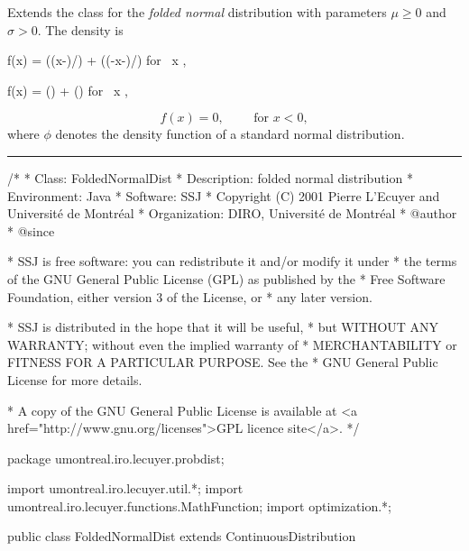 
Extends the class  for
the {\em folded normal\/} distribution with
parameters $\mu \ge 0$  and $\sigma > 0$.
The density is
\begin{htmlonly}
\eq
 f(x) =   \phi \left((x-\mu)/\sigma\right) + \phi \left((-x-\mu)/\sigma\right) 
   \qquad \mbox {for  } x ,
\endeq
\end{htmlonly}
\begin{latexonly} 
\eq
 f(x) = \phi \left(\right) +
        \phi \left(\right) 
   \qquad \mbox {for  } x ,   
\endeq
\end{latexonly}
$$
f(x) = 0, \qquad \mbox{ for } x < 0,
$$ 
where $ \phi $ denotes the density function 
of a standard normal distribution.

\bigskip\hrule

\begin{code}
\begin{hide}
/*
 * Class:        FoldedNormalDist
 * Description:  folded normal distribution
 * Environment:  Java
 * Software:     SSJ 
 * Copyright (C) 2001  Pierre L'Ecuyer and Université de Montréal
 * Organization: DIRO, Université de Montréal
 * @author       
 * @since

 * SSJ is free software: you can redistribute it and/or modify it under
 * the terms of the GNU General Public License (GPL) as published by the
 * Free Software Foundation, either version 3 of the License, or
 * any later version.

 * SSJ is distributed in the hope that it will be useful,
 * but WITHOUT ANY WARRANTY; without even the implied warranty of
 * MERCHANTABILITY or FITNESS FOR A PARTICULAR PURPOSE.  See the
 * GNU General Public License for more details.

 * A copy of the GNU General Public License is available at
   <a href="http://www.gnu.org/licenses">GPL licence site</a>.
 */
\end{hide}
package  umontreal.iro.lecuyer.probdist;
\begin{hide}
import umontreal.iro.lecuyer.util.*;
import umontreal.iro.lecuyer.functions.MathFunction;
import optimization.*;
\end{hide}

public class FoldedNormalDist extends ContinuousDistribution\begin{hide} {
   protected double mu;
   protected double sigma;
   private static final double RACPI = 1.7724538509055160273; // Sqrt[PI]

   private static class FunctionInverse implements MathFunction {
        private double u, mu, sigma;

        public FunctionInverse (double mu, double sigma, double u) {
            this.u = u;
            this.mu = mu;
            this.sigma = sigma;
        }

        public double evaluate (double x) {
            return u - cdf(mu, sigma, x);
        }
    }

\end{hide}\end{code}

